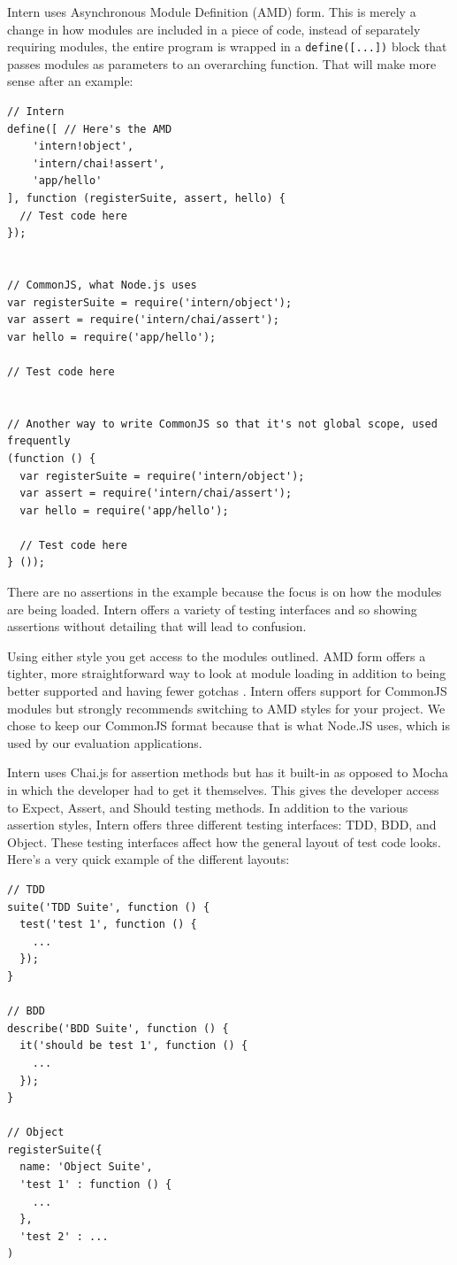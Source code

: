 \documentclass[12pt]{ucthesis}
\begin{document}
Intern uses Asynchronous Module Definition (AMD) form. This is merely a change in how modules are included in a piece of code, instead of separately requiring modules, the entire program is wrapped in a \lstinline{define([...])} block that passes modules as parameters to an overarching function. That will make more sense after an example:
\begin{lstlisting}
// Intern
define([ // Here's the AMD
    'intern!object',
    'intern/chai!assert',
    'app/hello'
], function (registerSuite, assert, hello) {
  // Test code here
});


// CommonJS, what Node.js uses 
var registerSuite = require('intern/object');
var assert = require('intern/chai/assert');
var hello = require('app/hello');

// Test code here


// Another way to write CommonJS so that it's not global scope, used frequently
(function () {
  var registerSuite = require('intern/object');
  var assert = require('intern/chai/assert');
  var hello = require('app/hello');

  // Test code here
} ());
\end{lstlisting}
There are no assertions in the example because the focus is on how the modules are being loaded. Intern offers a variety of testing interfaces and so showing assertions without detailing that will lead to confusion.

Using either style you get access to the modules outlined. AMD form offers a tighter, more straightforward way to look at module loading in addition to being better supported and having fewer gotchas \cite{AMDInfo}. Intern offers support for CommonJS modules but strongly recommends switching to AMD styles for your project. We chose to keep our CommonJS format because that is what Node.JS uses, which is used by our evaluation applications.

Intern uses Chai.js for assertion methods but has it built-in as opposed to Mocha in which the developer had to get it themselves. This gives the developer access to Expect, Assert, and Should testing methods. In addition to the various assertion styles, Intern offers three different testing interfaces: TDD, BDD, and Object. These testing interfaces affect how the general layout of test code looks. Here's a very quick example of the different layouts:
\begin{lstlisting}
// TDD
suite('TDD Suite', function () {
  test('test 1', function () {
    ...
  });
}

// BDD
describe('BDD Suite', function () {
  it('should be test 1', function () {
    ...
  });
}

// Object
registerSuite({
  name: 'Object Suite', 
  'test 1' : function () {
    ...
  },
  'test 2' : ...
)
\end{lstlisting}
\end{document}
